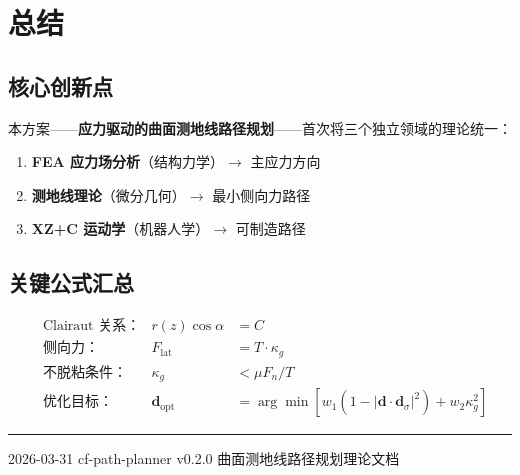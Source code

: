 \documentclass[11pt,a4paper]{article}
\begin{document}
\section{总结}

\subsection{核心创新点}

本方案——\textbf{应力驱动的曲面测地线路径规划}——首次将三个独立领域的理论统一：

\begin{enumerate}[nosep]
\item \textbf{FEA 应力场分析}（结构力学）$\to$ 主应力方向
\item \textbf{测地线理论}（微分几何）$\to$ 最小侧向力路径
\item \textbf{XZ+C 运动学}（机器人学）$\to$ 可制造路径
\end{enumerate}

\subsection{关键公式汇总}

\begin{align}
&\text{Clairaut 关系：} & r(z)\cos\alpha &= C \label{eq:clairaut} \\
&\text{侧向力：} & F_\text{lat} &= T \cdot \kappa_g \\
&\text{不脱粘条件：} & \kappa_g &< \mu F_n / T \\
&\text{优化目标：} & \mathbf{d}_\text{opt} &= \arg\min\left[w_1(1-|\mathbf{d}\cdot\mathbf{d}_\sigma|^2) + w_2\kappa_g^2\right]
\end{align}

\vfill
\noindent\rule{\textwidth}{0.5pt}
{\small 2026-03-31 \quad cf-path-planner v0.2.0 \quad 曲面测地线路径规划理论文档}
\end{document}

